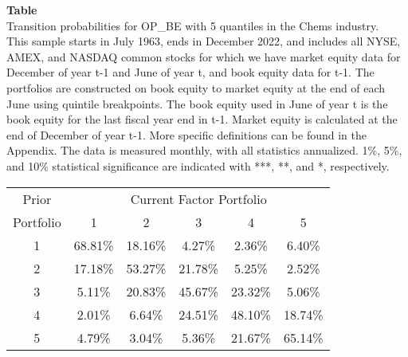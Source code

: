 \begin{table*}[ht!]
\raggedright
{}
\label{tab: transition_probs_OP_BE_Chems_with_5_quantiles}
\textbf{Table \thetable} \\
Transition probabilities for OP_BE with 5 quantiles in the Chems industry. \\
\hspace*{1em}This sample starts in July 1963, ends in December 2022, and includes all NYSE, AMEX, and NASDAQ common stocks for which we have market equity data for December of year t-1 and June of year t, and book equity data for t-1. The portfolios are constructed on book equity to market equity at the end of each June using quintile breakpoints.  The book equity used in June of year t is the book equity for the last fiscal year end in t-1.  Market equity is calculated at the end of December of year t-1.  More specific definitions can be found in the Appendix.  The data is measured monthly, with all statistics annualized.  1\%, 5\%, and 10\% statistical significance are indicated with ***, **, and *, respectively. \\
\vspace{0.5em}
\centering
\begin{adjustbox}{max width=\textwidth}
\begin{tabular}{@{}cccccc@{}}
\toprule
Prior & \multicolumn{5}{c}{Current Factor Portfolio} \\
Portfolio & 1 & 2 & 3 & 4 & 5 \\
\midrule
1 & 68.81\% & 18.16\% & 4.27\% & 2.36\% & 6.40\% \\
2 & 17.18\% & 53.27\% & 21.78\% & 5.25\% & 2.52\% \\
3 & 5.11\% & 20.83\% & 45.67\% & 23.32\% & 5.06\% \\
4 & 2.01\% & 6.64\% & 24.51\% & 48.10\% & 18.74\% \\
5 & 4.79\% & 3.04\% & 5.36\% & 21.67\% & 65.14\% \\
\bottomrule
\end{tabular}
\end{adjustbox}
\end{table*}